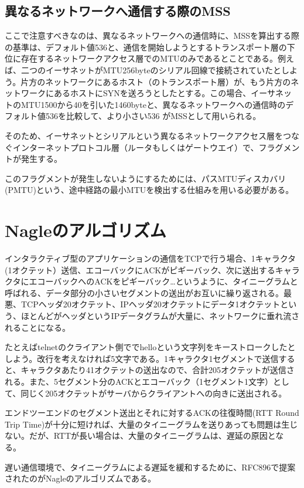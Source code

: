 \subsection{異なるネットワークへ通信する際のMSS}

ここで注意すべきなのは、異なるネットワークへの通信時に、MSSを算出する際の基準は、デフォルト値536と、通信を開始しようとするトランスポート層の下位に存在するネットワークアクセス層でのMTUのみであるとことである。例えば、二つのイーサネットがMTU256byteのシリアル回線で接続されていたとしよう。片方のネットワークにあるホスト（のトランスポート層）が、もう片方のネットワークにあるホストにSYNを送ろうとしたとする。この場合、イーサネットのMTU1500から40を引いた1460byteと、異なるネットワークへの通信時のデフォルト値536を比較して、より小さい536 がMSSとして用いられる。

そのため、イーサネットとシリアルという異なるネットワークアクセス層をつなぐインターネットプロトコル層（ルータもしくはゲートウエイ）で、フラグメントが発生する。

このフラグメントが発生しないようにするためには、パスMTUディスカバリ(PMTU)という、途中経路の最小MTUを検出する仕組みを用いる必要がある。

\section{Nagleのアルゴリズム}

インタラクティブ型のアプリケーションの通信をTCPで行う場合、1キャラクタ(1オクテット）送信、エコーバックにACKがピギーバック、次に送出するキャラクタにエコーバックへのACKをピギーバック…というように、タイニーグラムと呼ばれる、データ部分の小さいセグメントの送出がお互いに繰り返される。最悪、TCPヘッダ20オクテット、IPヘッダ20オクテットにデータ1オクテットという、ほとんどがヘッダというIPデータグラムが大量に、ネットワークに垂れ流されることになる。

たとえばtelnetのクライアント側ででhelloという文字列をキーストロークしたとしよう。改行を考えなければ5文字である。1キャラクタ1セグメントで送信すると、キャラクタあたり41オクテットの送出なので、合計205オクテットが送信される。また、5セグメント分のACKとエコーバック（1セグメント1文字）として、同じく205オクテットがサーバからクライアントへの向きに送出される。

エンドツーエンドのセグメント送出とそれに対するACKの往復時間(RTT Round Trip Time)が十分に短ければ、大量のタイニーグラムを送りあっても問題は生じない。だが、RTTが長い場合は、大量のタイニーグラムは、遅延の原因となる。

遅い通信環境で、タイニーグラムによる遅延を緩和するために、RFC896で提案されたのがNagleのアルゴリズムである。

